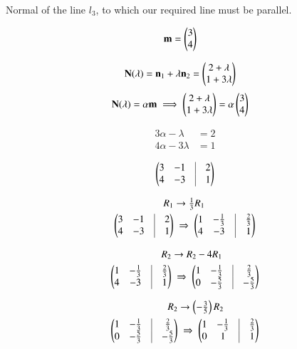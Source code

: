 \documentclass[journal]{IEEEtran}
\begin{document}
Normal of the line $l_3$, to which our required line must be parallel.


\begin{align}
\mathbf{m} &= \begin{pmatrix}3\\4\end{pmatrix}
\end{align}


\begin{align}
\mathbf{N}(\lambda) &= \mathbf{n}_1 + \lambda\mathbf{n}_2 = \begin{pmatrix}2+\lambda\\1+3\lambda\end{pmatrix}
\end{align}
\begin{align}
\mathbf{N}(\lambda) &= \alpha\mathbf{m}
\implies \begin{pmatrix}2+\lambda\\1+3\lambda\end{pmatrix} = \alpha\begin{pmatrix}3\\4\end{pmatrix}
\end{align}


\begin{align}
3\alpha - \lambda &= 2 \\
4\alpha - 3\lambda &= 1
\end{align}

\begin{align}
\myvec{3 & -1 & \vline & 2 \\ 4 & -3 & \vline & 1}
\end{align}

\begin{align}
R_1 &\to \tfrac{1}{3}R_1 \\
\myvec{3 & -1 & \vline & 2 \\ 4 & -3 & \vline & 1} 
&\;\Rightarrow\;
\myvec{1 & -\tfrac{1}{3} & \vline & \tfrac{2}{3} \\ 4 & -3 & \vline & 1}
\end{align}

\begin{align}
R_2 &\to R_2 - 4R_1 \\
\myvec{1 & -\tfrac{1}{3} & \vline & \tfrac{2}{3} \\ 4 & -3 & \vline & 1}
&\;\Rightarrow\;
\myvec{1 & -\tfrac{1}{3} & \vline & \tfrac{2}{3} \\ 0 & -\tfrac{5}{3} & \vline & -\tfrac{5}{3}}
\end{align}

\begin{align}
R_2 &\to \left(-\tfrac{3}{5}\right)R_2 \\
\myvec{1 & -\tfrac{1}{3} & \vline & \tfrac{2}{3} \\ 0 & -\tfrac{5}{3} & \vline & -\tfrac{5}{3}}
&\;\Rightarrow\;
\myvec{1 & -\tfrac{1}{3} & \vline & \tfrac{2}{3} \\ 0 & 1 & \vline & 1}
\end{align}
\end{document}
